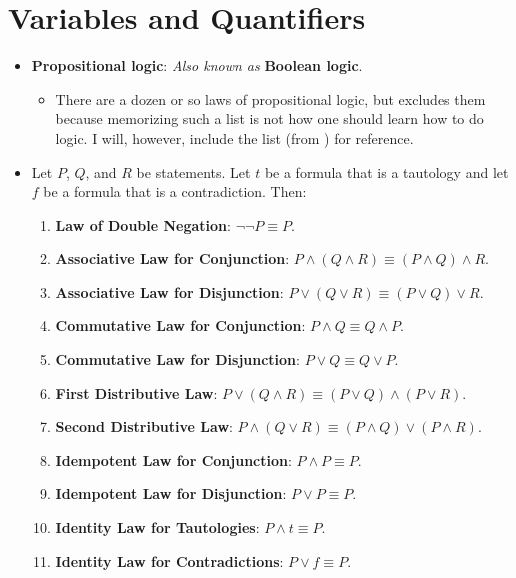 \documentclass[../main.tex]{subfiles}
\begin{document}
\section{Variables and Quantifiers}\label{sse:A.4}
\begin{itemize}
    \item \textbf{Propositional logic}:  \emph{Also known as} \textbf{Boolean logic}.
    \begin{itemize}
        \item There are a dozen or so laws of propositional logic, but \cite{bib:AnalysisI} excludes them because memorizing such a list is not how one should learn how to do logic. I will, however, include the list (from \cite{bib:PropositionalLogicLaws}) for reference.
    \end{itemize}
    \item Let $P$, $Q$, and $R$ be statements. Let $t$ be a formula that is a tautology and let $f$ be a formula that is a contradiction. Then:
    \begin{enumerate}
        \item \textbf{Law of Double Negation}: $\neg\neg P\equiv P$.
        \item \textbf{Associative Law for Conjunction}: $P\wedge(Q\wedge R)\equiv(P\wedge Q)\wedge R$.
        \item \textbf{Associative Law for Disjunction}: $P\vee(Q\vee R)\equiv (P\vee Q)\vee R$.
        \item \textbf{Commutative Law for Conjunction}: $P\wedge Q\equiv Q\wedge P$.
        \item \textbf{Commutative Law for Disjunction}: $P\vee Q\equiv Q\vee P$.
        \item \textbf{First Distributive Law}: $P\vee(Q\wedge R)\equiv(P\vee Q)\wedge(P\vee R)$.
        \item \textbf{Second Distributive Law}: $P\wedge(Q\vee R)\equiv(P\wedge Q)\vee(P\wedge R)$.
        \item \textbf{Idempotent Law for Conjunction}: $P\wedge P\equiv P$.
        \item \textbf{Idempotent Law for Disjunction}: $P\vee P\equiv P$.
        \item \textbf{Identity Law for Tautologies}: $P\wedge t\equiv P$.
        \item \textbf{Identity Law for Contradictions}: $P\vee f\equiv P$.

\end{enumerate}
\end{itemize}
\end{document}
